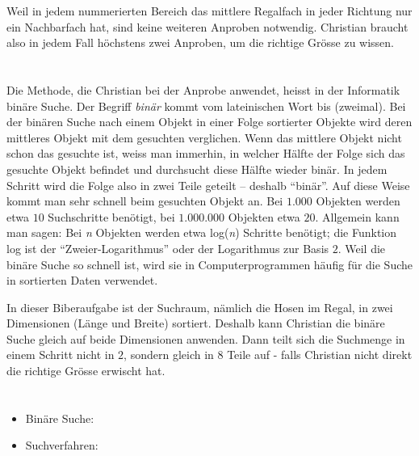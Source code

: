 {{Weil in jedem nummerierten Bereich das mittlere Regalfach in jeder Richtung nur ein Nachbarfach hat, sind keine weiteren Anproben notwendig. Christian braucht also in jedem Fall höchstens zwei Anproben, um die richtige Grösse zu wissen.



\section*{\BrochureItsInformatics}
Die Methode, die Christian bei der Anprobe anwendet, heisst in der Informatik binäre Suche. Der Begriff \emph{binär} kommt vom lateinischen Wort bis (zweimal). Bei der binären Suche nach einem Objekt in einer Folge sortierter Objekte wird deren mittleres Objekt mit dem gesuchten verglichen. Wenn das mittlere Objekt nicht schon das gesuchte ist, weiss man immerhin, in welcher Hälfte der Folge sich das gesuchte Objekt befindet und durchsucht diese Hälfte wieder binär. In jedem Schritt wird die Folge also in zwei Teile geteilt – deshalb \enquote{binär}. Auf diese Weise kommt man sehr schnell beim gesuchten Objekt an. Bei $1.000$ Objekten werden etwa $10$ Suchschritte benötigt, bei $1.000$.$000$ Objekten etwa $20$. Allgemein kann man sagen: Bei \emph{n} Objekten werden etwa log(\emph{n}) Schritte benötigt; die Funktion log ist der \enquote{Zweier-Logarithmus} oder der Logarithmus zur Basis $2$. Weil die binäre Suche so schnell ist, wird sie in Computerprogrammen häufig für die Suche in sortierten Daten verwendet.

In dieser Biberaufgabe ist der Suchraum, nämlich die Hosen im Regal, in zwei Dimensionen (Länge und Breite) sortiert. Deshalb kann Christian die binäre Suche gleich auf beide Dimensionen anwenden. Dann teilt sich die Suchmenge in einem Schritt nicht in $2$, sondern gleich in $8$ Teile auf - falls Christian nicht direkt die richtige Grösse erwischt hat.



\section*{\BrochureWebsitesAndKeywords}
{\raggedright
\begin{itemize}
  \item Binäre Suche: \href{https://de.wikipedia.org/wiki/Bin\%C3\%A4re_Suche}{}
  \item Suchverfahren: \href{https://de.wikipedia.org/wiki/Suchverfahren}{}
\end{itemize}


}}}
